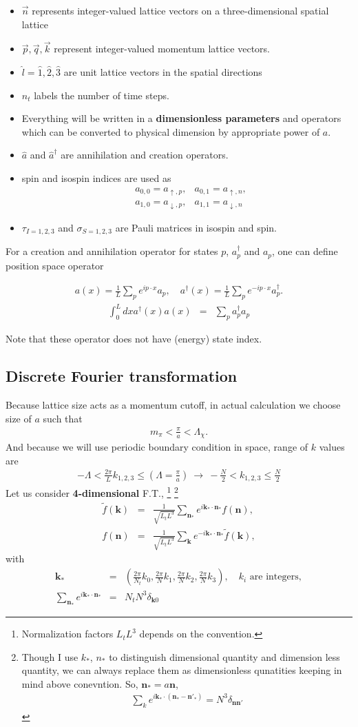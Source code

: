 \documentclass[10pt]{book}
\def\bm{\boldsymbol}
\newcommand{\bea}{\begin{eqnarray}}
\newcommand{\eea}{\end{eqnarray}}
\newcommand{\no}{\nonumber \\}
\def\vk{{\bm k}}
\def\vn{{\bm n}}
\begin{document}
\begin{itemize}
\item ${\vec n}$ represents integer-valued lattice vectors on a three-dimensional spatial lattice
\item ${\vec p},{\vec q},{\vec k}$ represent integer-valued momentum lattice vectors.
    
\item $\hat{l}=\hat{1},\hat{2},\hat{3}$ are unit lattice vectors in the spatial directions
\item $n_t$ labels the number of time steps.
\item Everything will be written in a {\bf dimensionless parameters} 
      and operators which can be converted to physical dimension by appropriate power of $a$. 
\item $\hat{a}$ and $\hat{a}^\dagger$ are annihilation and creation operators.
\item spin and isospin indices are used as
      \bea 
      & a_{0,0}=a_{\uparrow,p}, & a_{0,1}=a_{\uparrow,n},\no 
      & a_{1,0}=a_{\downarrow,p}, & a_{1,1}=a_{\downarrow,n}
      \eea     
\item $\tau_{I=1,2,3}$ and $\sigma_{S=1,2,3}$ are Pauli matrices in isospin and spin.        
\end{itemize}

For a creation and annihilation operator for states $p$, $a^\dagger_p$ and $a_p$,
one can define position space operator 

\bea 
a(x)=\frac{1}{L}\sum_{p} e^{ip\cdot x} a_p, \quad
a^\dagger(x)=\frac{1}{L}\sum_{p} e^{-ip\cdot x} a^\dagger_p.
\eea 
\bea 
\int_0^L dx a^\dagger(x) a(x)&=&\sum_p a^\dagger_p a_p  
\eea 

Note that these operator does not have (energy) state index. 
\subsection{Discrete Fourier transformation}
Because lattice size acts as a momentum cutoff, in actual calculation we choose
size of $a$ such that 
\bea 
m_\pi< \frac{\pi}{a}< \Lambda_\chi.
\eea 
And because we will use periodic boundary condition in space,
range of $k$ values are
\bea 
-\Lambda < \frac{2\pi}{L}k_{1,2,3}\leq (\Lambda=\frac{\pi}{a})\ 
\to\ -\frac{N}{2}< k_{1,2,3}\leq \frac{N}{2}
\eea 
Let us consider {\bf 4-dimensional} F.T.,
\footnote{ Normalization factors $L_t L^3$ depends on the convention.}
\footnote{
	Though I use $k_*$, $n_*$ to distinguish dimensional quantity and dimension less quantity,
	we can always replace them as dimensionless qunatities keeping in mind above conevntion.
	So, $\vn_*=a\vn$,
	\bea 
	\sum_{k} e^{i\vk_*\cdot (\vn_*-\vn'_*)}=N^3 \delta_{\vn \vn'}
	\eea 
}
\bea 
\tilde{f}(\vk)&=&\frac{1}{\sqrt{L_t L^3}}\sum_{\vn_*} e^{i\vk_*\cdot\vn_*} f(\vn),\no 
f(\vn)&=&\frac{1}{\sqrt{L_t L^3}}\sum_{\vk} e^{-i\vk_*\cdot\vn_*} \tilde{f}(\vk),
\eea 
with
\bea 
\vk_*&=&\left(\frac{2\pi}{N_t}k_0,\frac{2\pi}{N}k_1,\frac{2\pi}{N}k_2,\frac{2\pi}{N}k_3\right),
\quad \mbox{$k_i$ are integers},\no   
\sum_{\vn_*}e^{i\vk_*\cdot\vn_*}&=& N_t N^3 \delta_{\vk 0}
\eea 
\end{document}
